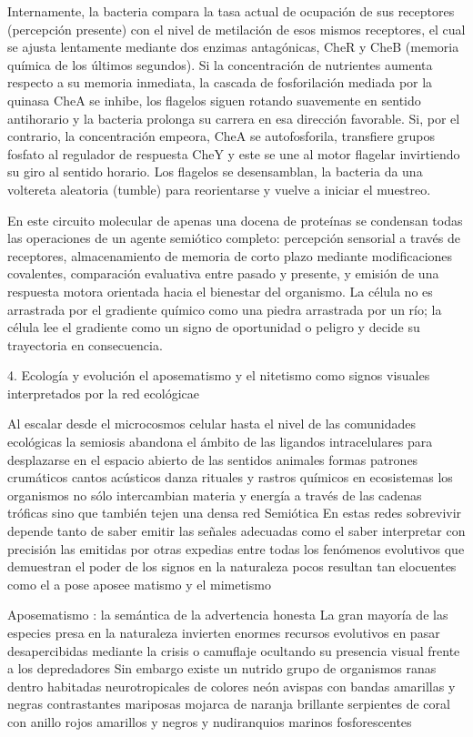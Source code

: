 Internamente, la bacteria compara la tasa actual de ocupación de sus receptores (percepción presente) con el nivel de metilación de esos mismos receptores, el cual se ajusta lentamente mediante dos enzimas antagónicas, CheR y CheB (memoria química de los últimos segundos). 
Si la concentración de nutrientes aumenta respecto a su memoria inmediata, la cascada de fosforilación mediada por la quinasa CheA se inhibe, los flagelos siguen rotando suavemente en sentido antihorario y la bacteria prolonga su carrera en esa dirección favorable. 
Si, por el contrario, la concentración empeora, CheA se autofosforila, transfiere grupos fosfato al regulador de respuesta CheY y este se une al motor flagelar invirtiendo su giro al sentido horario. 
Los flagelos se desensamblan, la bacteria da una voltereta aleatoria (tumble) para reorientarse y vuelve a iniciar el muestreo.

En este circuito molecular de apenas una docena de proteínas se condensan todas las operaciones de un agente semiótico completo: percepción sensorial a través de receptores, almacenamiento de memoria de corto plazo mediante modificaciones covalentes, comparación evaluativa entre pasado y presente, y emisión de una respuesta motora orientada hacia el bienestar del organismo. 
La célula no es arrastrada por el gradiente químico como una piedra arrastrada por un río; la célula lee el gradiente como un signo de oportunidad o peligro y decide su trayectoria en consecuencia.

4. Ecología y evolución el aposematismo y el nitetismo como signos visuales interpretados por la red ecológicae

Al escalar desde el microcosmos celular hasta el nivel de las comunidades ecológicas la semiosis abandona el ámbito de las ligandos intracelulares para desplazarse en el espacio abierto de las sentidos animales formas patrones crumáticos cantos acústicos danza rituales y rastros químicos en ecosistemas los organismos no sólo intercambian materia y energía a través de las cadenas tróficas sino que también tejen una densa red Semiótica 
En estas redes sobrevivir depende tanto de saber emitir las señales adecuadas como el saber interpretar con precisión las emitidas por otras expedias entre todas los fenómenos evolutivos que demuestran el poder de los signos en la naturaleza pocos resultan tan elocuentes como el a pose aposee matismo y el mimetismo

Aposematismo : la semántica de la advertencia honesta
La gran mayoría de las especies presa en la naturaleza invierten enormes recursos evolutivos en pasar desapercibidas mediante la crisis o camuflaje ocultando su presencia visual frente a los depredadores 
Sin embargo existe un nutrido grupo de organismos ranas dentro habitadas neurotropicales de colores neón avispas con bandas amarillas y negras contrastantes mariposas mojarca de naranja brillante serpientes de coral con anillo rojos amarillos y negros y nudiranquios marinos fosforescentes

